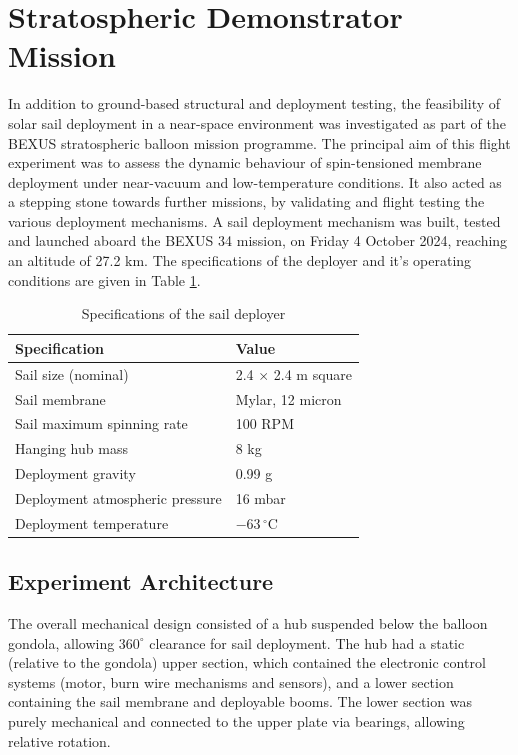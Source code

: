 \documentclass[final,3p,times,twocolumn]{elsarticle}
\begin{document}
\section{Stratospheric Demonstrator Mission}
\label{bexus_section}
\noindent In addition to ground-based structural and deployment testing, the feasibility of solar sail deployment in a near-space environment was investigated as part of the BEXUS stratospheric balloon mission programme. The principal aim of this flight experiment was to assess the dynamic behaviour of spin-tensioned membrane deployment under near-vacuum and low-temperature conditions. It also acted as a stepping stone towards further missions, by validating and flight testing the various deployment mechanisms. A sail deployment mechanism was built, tested and launched aboard the BEXUS 34 mission, on Friday 4 October 2024, reaching an altitude of 27.2 km. The specifications of the deployer and it's operating conditions are given in Table \ref{tab:sail_deployer_specs}.

\begin{table}[h!]
\centering
\begin{tabular}{ll}
\hline
\textbf{Specification} & \textbf{Value} \\
\hline
Sail size (nominal) & 2.4 $\times$ 2.4 m square\\
Sail membrane & Mylar, 12 micron\\
Sail maximum spinning rate & 100 RPM\\
Hanging hub mass & 8 kg\\
Deployment gravity& 0.99 g\\
Deployment atmospheric pressure& 16 mbar\\
Deployment temperature& $-63\,^{\circ}\mathrm{C}$\\
\hline
\end{tabular}
\caption{Specifications of the sail deployer}
\label{tab:sail_deployer_specs}
\end{table}

\subsection{Experiment Architecture}
\noindent The overall mechanical design consisted of a hub suspended below the balloon gondola, allowing $360^{\circ}$ clearance for sail deployment. The hub had a static (relative to the gondola) upper section, which contained the electronic control systems (motor, burn wire mechanisms and sensors), and a lower section containing the sail membrane and deployable booms. The lower section was purely mechanical and connected to the upper plate via bearings, allowing relative rotation.  
\end{document}
